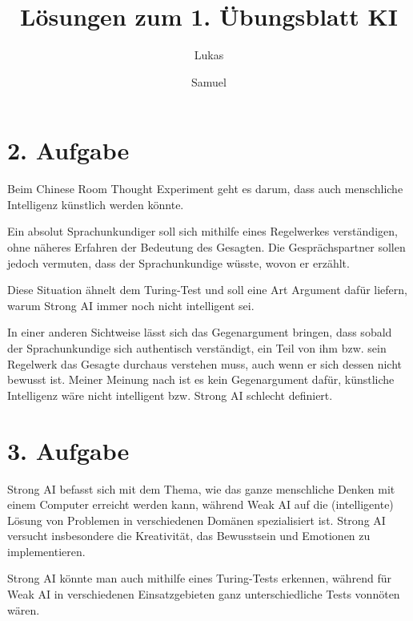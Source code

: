 \documentclass{article}
\begin{document}
\title{L\"osungen zum 1. \"Ubungsblatt KI}
\author{Lukas \and Samuel}

\maketitle

\section*{2. Aufgabe}

Beim Chinese Room Thought Experiment geht es darum, dass auch menschliche Intelligenz k\"unstlich werden k\"onnte.

Ein absolut Sprachunkundiger soll sich mithilfe eines Regelwerkes verst\"andigen, ohne n\"aheres Erfahren der Bedeutung des Gesagten. Die Gespr\"achspartner sollen jedoch vermuten, dass der Sprachunkundige w\"usste, wovon er erz\"ahlt.

Diese Situation \"ahnelt dem Turing-Test und soll eine Art Argument daf\"ur liefern, warum Strong AI immer noch nicht intelligent sei.

In einer anderen Sichtweise l\"asst sich das Gegenargument bringen, dass sobald der Sprachunkundige sich authentisch verst\"andigt, ein Teil von ihm bzw. sein Regelwerk das Gesagte durchaus verstehen muss, auch wenn er sich dessen nicht bewusst ist. Meiner Meinung nach ist es kein Gegenargument daf\"ur, k\"unstliche Intelligenz w\"are nicht intelligent bzw. Strong AI schlecht definiert.

\section*{3. Aufgabe}

Strong AI befasst sich mit dem Thema, wie das ganze menschliche Denken mit einem Computer erreicht werden kann, w\"ahrend Weak AI auf die (intelligente) L\"osung von Problemen in verschiedenen Dom\"anen spezialisiert ist. Strong AI versucht insbesondere die Kreativit\"at, das Bewusstsein und Emotionen zu implementieren.

Strong AI k\"onnte man auch mithilfe eines Turing-Tests erkennen, w\"ahrend f\"ur Weak AI in verschiedenen Einsatzgebieten ganz unterschiedliche Tests vonn\"oten w\"aren.
\end{document}
